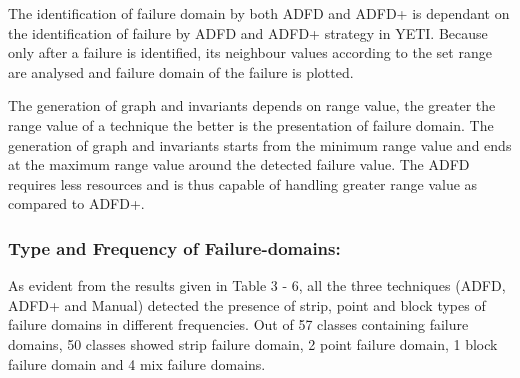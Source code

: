 \documentclass[runningheads,a4paper]{llncs}
\begin{document}
The identification of failure domain by both ADFD and ADFD+ is dependant on the identification of failure by ADFD and ADFD+ strategy in YETI. Because only after a failure is identified, its neighbour values according to the set range are analysed and failure domain of the failure is plotted.

The generation of graph and invariants depends on range value, the greater the range value of a technique the better is the presentation of failure domain. The generation of graph and invariants starts from the minimum range value and ends at the maximum range value around the detected failure value. The ADFD requires less resources and is thus capable of handling  greater range value as compared to ADFD+.  








\subsubsection{Type and Frequency of Failure-domains:}
As evident from the results given in Table 3 - 6, all the three techniques (ADFD, ADFD+ and Manual) detected the presence of strip, point and block types of failure domains in different frequencies. Out of 57 classes containing failure domains, 50 classes showed strip failure domain, 2 point failure domain, 1 block failure domain and 4 mix failure domains.  
\end{document}
